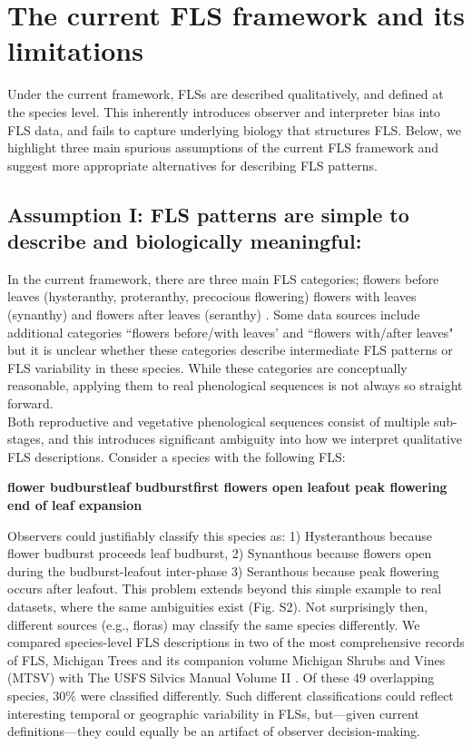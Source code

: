 \documentclass{article}
\begin{document}
{\section*{The current FLS framework and its limitations}
Under the current framework, FLSs are described qualitatively, and defined at the species level. This inherently introduces observer and interpreter bias into FLS data, and fails to capture underlying biology that structures FLS. Below, we highlight three main spurious assumptions of the current FLS framework and suggest more appropriate alternatives for describing FLS patterns.
\subsection*{Assumption I: FLS patterns are simple to describe and biologically meaningful:}
In the current framework, there are three main FLS categories; flowers before leaves (hysteranthy, proteranthy, precocious flowering) flowers with leaves (synanthy) and flowers after leaves (seranthy) \citep{Lamont2011, Heinig1899}. Some data sources \citep[e.g.][]{Burns1990,Barnes2004} include additional categories ``flowers before/with leaves' and ``flowers with/after leaves" but it is unclear whether these categories describe intermediate FLS patterns or FLS variability in these species. While these categories are conceptually reasonable, applying them to real phenological sequences is not always so straight forward.\\

Both reproductive and vegetative phenological sequences consist of multiple sub-stages, and this introduces significant ambiguity into how we interpret qualitative FLS descriptions. Consider a species with the following FLS:\\

\begin{center}
\textbf{flower budburst}\rightarrow \textbf{leaf budburst}\rightarrow \textbf{first flowers open} \rightarrow \textbf{leafout} \rightarrow \textbf{peak flowering} \rightarrow \textbf{end of leaf expansion}\\
\end{center}

\noindent Observers could justifiably classify this species as: 1) Hysteranthous because flower budburst proceeds leaf budburst, 2) Synanthous because flowers open during the budburst-leafout inter-phase 3) Seranthous because peak flowering occurs after leafout. This problem extends beyond this simple example to real datasets, \citep[e.g.][]{OKeefe2015} where the same ambiguities exist (Fig. S2). Not surprisingly then, different sources (e.g., floras) may classify the same species differently. We compared species-level FLS descriptions in two of the most comprehensive records of FLS, Michigan Trees and its companion volume Michigan Shrubs and Vines (MTSV) \citep{Barnes2004,Barnes2016} with The USFS Silvics Manual Volume II \citep{Burns1990}. Of these 49 overlapping species, 30\% were classified differently. Such different classifications could reflect interesting temporal or geographic variability in FLSs, but---given current definitions---they could equally be an artifact of observer decision-making.\\

}
\end{document}
